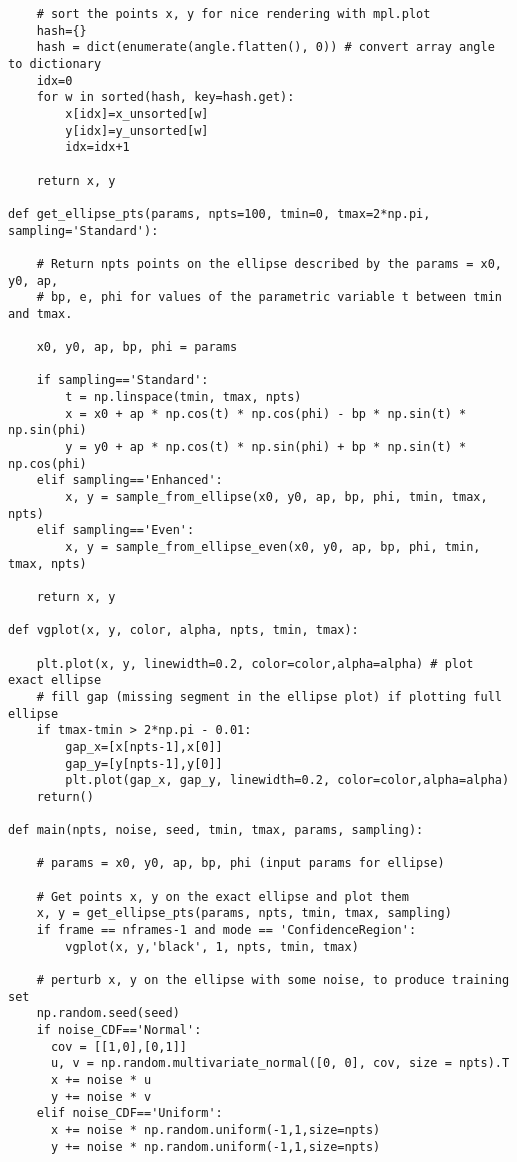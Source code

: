\documentclass[oneside,10pt]{book}
\begin{document}
\begin{lstlisting}
    # sort the points x, y for nice rendering with mpl.plot
    hash={}
    hash = dict(enumerate(angle.flatten(), 0)) # convert array angle to dictionary
    idx=0
    for w in sorted(hash, key=hash.get):
        x[idx]=x_unsorted[w]
        y[idx]=y_unsorted[w]
        idx=idx+1

    return x, y

def get_ellipse_pts(params, npts=100, tmin=0, tmax=2*np.pi, sampling='Standard'):

    # Return npts points on the ellipse described by the params = x0, y0, ap,
    # bp, e, phi for values of the parametric variable t between tmin and tmax.

    x0, y0, ap, bp, phi = params
    
    if sampling=='Standard':
        t = np.linspace(tmin, tmax, npts)
        x = x0 + ap * np.cos(t) * np.cos(phi) - bp * np.sin(t) * np.sin(phi)
        y = y0 + ap * np.cos(t) * np.sin(phi) + bp * np.sin(t) * np.cos(phi)
    elif sampling=='Enhanced':
        x, y = sample_from_ellipse(x0, y0, ap, bp, phi, tmin, tmax, npts) 
    elif sampling=='Even':
        x, y = sample_from_ellipse_even(x0, y0, ap, bp, phi, tmin, tmax, npts) 

    return x, y

def vgplot(x, y, color, alpha, npts, tmin, tmax):

    plt.plot(x, y, linewidth=0.2, color=color,alpha=alpha) # plot exact ellipse 
    # fill gap (missing segment in the ellipse plot) if plotting full ellipse
    if tmax-tmin > 2*np.pi - 0.01:
        gap_x=[x[npts-1],x[0]]
        gap_y=[y[npts-1],y[0]]
        plt.plot(gap_x, gap_y, linewidth=0.2, color=color,alpha=alpha)
    return()

def main(npts, noise, seed, tmin, tmax, params, sampling):

    # params = x0, y0, ap, bp, phi (input params for ellipse)

    # Get points x, y on the exact ellipse and plot them
    x, y = get_ellipse_pts(params, npts, tmin, tmax, sampling)
    if frame == nframes-1 and mode == 'ConfidenceRegion':
        vgplot(x, y,'black', 1, npts, tmin, tmax)

    # perturb x, y on the ellipse with some noise, to produce training set
    np.random.seed(seed)
    if noise_CDF=='Normal':
      cov = [[1,0],[0,1]]  
      u, v = np.random.multivariate_normal([0, 0], cov, size = npts).T
      x += noise * u
      y += noise * v
    elif noise_CDF=='Uniform':
      x += noise * np.random.uniform(-1,1,size=npts) 
      y += noise * np.random.uniform(-1,1,size=npts)


\end{lstlisting}
\end{document}
